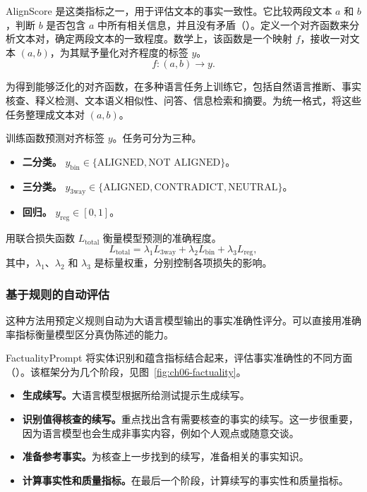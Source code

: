AlignScore 是这类指标之一，用于评估文本的事实一致性。它比较两段文本 $a$ 和 $b$，判断 $b$ 是否包含 $a$ 中所有相关信息，并且没有矛盾（）。定义一个对齐函数来分析文本对，确定两段文本的一致程度。数学上，该函数是一个映射 $f$，接收一对文本 $(a,b)$，为其赋予量化对齐程度的标签 $y$。
\begin{equation}
f\colon(a,b)\to y.
\label{eq:ch06-align-mapping}
\end{equation}

为得到能够泛化的对齐函数，在多种语言任务上训练它，包括自然语言推断、事实核查、释义检测、文本语义相似性、问答、信息检索和摘要。为统一格式，将这些任务整理成文本对 $(a,b)$。

训练函数预测对齐标签 $y$。任务可分为三种。
\begin{itemize}
\item \textbf{二分类。} $y_{\mathrm{bin}}\in\{\text{ALIGNED},\text{NOT ALIGNED}\}$。
\item \textbf{三分类。} $y_{\mathrm{3way}}\in\{\text{ALIGNED},\text{CONTRADICT},\text{NEUTRAL}\}$。
\item \textbf{回归。} $y_{\mathrm{reg}}\in[0,1]$。
\end{itemize}
用联合损失函数 $L_{\mathrm{total}}$ 衡量模型预测的准确程度。
\begin{equation}
L_{\mathrm{total}}=\lambda_1L_{\mathrm{3way}}
  +\lambda_2L_{\mathrm{bin}}+\lambda_3L_{\mathrm{reg}},
\label{eq:ch06-align-loss}
\end{equation}
其中，$\lambda_1$、$\lambda_2$ 和 $\lambda_3$ 是标量权重，分别控制各项损失的影响。

\subsubsection{基于规则的自动评估}
这种方法用预定义规则自动为大语言模型输出的事实准确性评分。可以直接用准确率指标衡量模型区分真伪陈述的能力。

FactualityPrompt 将实体识别和蕴含指标结合起来，评估事实准确性的不同方面（）。该框架分为几个阶段，见图~\ref{fig:ch06-factuality}。

\begin{itemize}
\item \textbf{生成续写。}大语言模型根据所给测试提示生成续写。
\item \textbf{识别值得核查的续写。}重点找出含有需要核查的事实的续写。这一步很重要，因为语言模型也会生成非事实内容，例如个人观点或随意交谈。
\item \textbf{准备参考事实。}为核查上一步找到的续写，准备相关的事实知识。
\item \textbf{计算事实性和质量指标。}在最后一个阶段，计算续写的事实性和质量指标。
\end{itemize}

